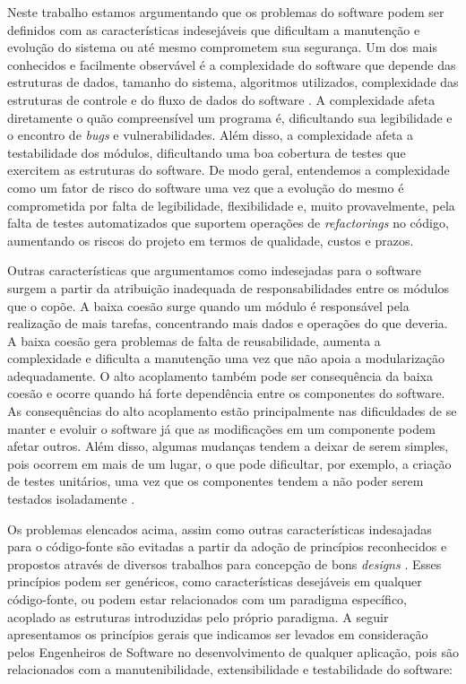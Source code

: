 %

Neste trabalho estamos argumentando que os problemas do software podem ser definidos com as características indesejáveis que dificultam a manutenção e evolução do sistema ou até mesmo comprometem sua segurança.
%
Um dos mais conhecidos e facilmente observável é a complexidade do software que depende das estruturas de dados, tamanho do sistema, algoritmos utilizados, complexidade das estruturas de controle e do fluxo de dados do software \cite{basili1983}.
%
A complexidade afeta diretamente o quão compreensível um programa é, dificultando sua legibilidade e o encontro de \emph{bugs} e vulnerabilidades.
%
Além disso, a complexidade afeta a testabilidade dos módulos, dificultando uma boa cobertura de testes que exercitem as estruturas do software.
%
De modo geral, entendemos a complexidade como um fator de risco do software uma vez que a evolução do mesmo é comprometida por falta de legibilidade, flexibilidade e, muito provavelmente, pela falta de testes automatizados que suportem operações de \emph{refactorings} no código, aumentando os riscos do projeto em termos de qualidade, custos e prazos.


Outras características que argumentamos como indesejadas para o software surgem a partir da atribuição inadequada de responsabilidades entre os módulos que o copõe.
%
A baixa coesão surge quando um módulo é responsável pela realização de mais tarefas, concentrando mais dados e operações do que deveria. A baixa coesão gera problemas de falta de reusabilidade, aumenta a complexidade e dificulta a manutenção uma vez que não apoia a modularização adequadamente.
%
O alto acoplamento também pode ser consequência da baixa coesão e ocorre quando há forte dependência entre os componentes do software.
%
As consequências do alto acoplamento estão principalmente nas dificuldades de se manter e evoluir o software já que as modificações em um componente podem afetar outros.
%
Além disso, algumas mudanças tendem a deixar de serem simples, pois ocorrem em mais de um lugar, o que pode dificultar, por exemplo, a criação de testes unitários, uma vez que os componentes tendem a não poder serem testados isoladamente \cite{martensson2005}.


Os problemas elencados acima, assim como outras características indesajadas para o código-fonte são evitadas a partir da adoção de princípios reconhecidos e propostos através de diversos trabalhos para concepção de bons \emph{designs} \cite{martin2002} \cite{lakos1996} \cite{demeyer2002} \cite{lieberherr1996}. 
%
Esses princípios podem ser genéricos, como características desejáveis em qualquer código-fonte, ou podem estar relacionados com um paradigma específico, acoplado as estruturas introduzidas pelo próprio paradigma.
%
A seguir apresentamos os princípios gerais que indicamos ser levados em consideração pelos Engenheiros de Software no desenvolvimento de qualquer aplicação, pois são relacionados com a manutenibilidade, extensibilidade e testabilidade do software:

